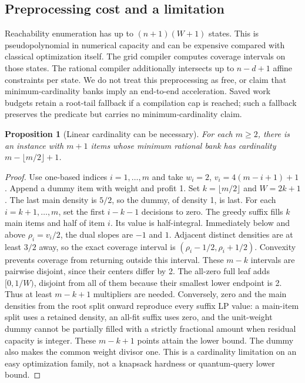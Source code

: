 \documentclass[referee,pdflatex,sn-mathphys-num]{sn-jnl}
\theoremstyle{thmstyleone}
\newtheorem{proposition}[theorem]{Proposition}
\theoremstyle{thmstyletwo}
\begin{document}
\subsection{Preprocessing cost and a limitation}
Reachability enumeration has up to $(n+1)(W+1)$ states. This is pseudopolynomial in numerical capacity and can be expensive compared with classical optimization itself. The grid compiler computes coverage intervals on those states. The rational compiler additionally intersects up to $n-d+1$ affine constraints per state. We do not treat this preprocessing as free, or claim that minimum-cardinality banks imply an end-to-end acceleration. Saved work budgets retain a root-tail fallback if a compilation cap is reached; such a fallback preserves the predicate but carries no minimum-cardinality claim.

\begin{proposition}[Linear cardinality can be necessary]\label{prop:barrier}
For each $m\geq2$, there is an instance with $m+1$ items whose minimum rational bank has cardinality $m-\lfloor m/2\rfloor+1$.
\end{proposition}
\begin{proof}
Use one-based indices $i=1,\ldots,m$ and take $w_i=2$, $v_i=4(m-i+1)+1$. Append a dummy item with weight and profit 1. Set $k=\lfloor m/2\rfloor$ and $W=2k+1$. The last main density is $5/2$, so the dummy, of density 1, is last. For each $i=k+1,\ldots,m$, set the first $i-k-1$ decisions to zero. The greedy suffix fills $k$ main items and half of item $i$. Its value is half-integral. Immediately below and above $\rho_i=v_i/2$, the dual slopes are $-1$ and $1$. Adjacent distinct densities are at least $3/2$ away, so the exact coverage interval is $(\rho_i-1/2,\rho_i+1/2)$. Convexity prevents coverage from returning outside this interval. These $m-k$ intervals are pairwise disjoint, since their centers differ by 2. The all-zero full leaf adds $[0,1/W)$, disjoint from all of them because their smallest lower endpoint is 2. Thus at least $m-k+1$ multipliers are needed. Conversely, zero and the main densities from the root split onward reproduce every suffix LP value: a main-item split uses a retained density, an all-fit suffix uses zero, and the unit-weight dummy cannot be partially filled with a strictly fractional amount when residual capacity is integer. These $m-k+1$ points attain the lower bound. The dummy also makes the common weight divisor one. This is a cardinality limitation on an easy optimization family, not a knapsack hardness or quantum-query lower bound.
\end{proof}
\end{document}
